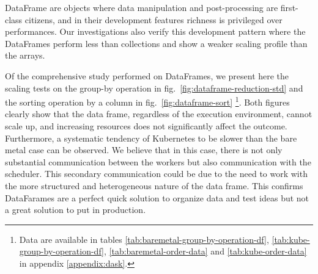 


DataFrame are objects where data manipulation and post-processing are
first-class citizens, and in their development features richness is privileged
over performances. Our investigations also verify this development pattern where
the DataFrames perform less than collections and show a weaker scaling profile
than the arrays. 

Of the comprehensive study performed on DataFrames, we present here the scaling
tests on the group-by operation in fig.~\ref{fig:dataframe-reduction-std} and
the sorting operation by a column in fig.~\ref{fig:dataframe-sort}
\footnote{Data are available in tables
\ref{tab:baremetal-group-by-operation-df}, \ref{tab:kube-group-by-operation-df},
\ref{tab:baremetal-order-data} and \ref{tab:kube-order-data} in appendix
\ref{appendix:dask}.}. Both figures clearly show that the data frame, regardless
of the execution environment, cannot scale up, and increasing resources does not
significantly affect the outcome. Furthermore, a systematic tendency of
Kubernetes to be slower than the bare metal case can be observed. We believe
that in this case, there is not only substantial communication between the
workers but also communication with the scheduler. This secondary communication
could be due to the need to work with the more structured and heterogeneous
nature of the data frame. This confirms DataFarames are a perfect quick solution
to organize data and test ideas but not a great solution to put in production.


